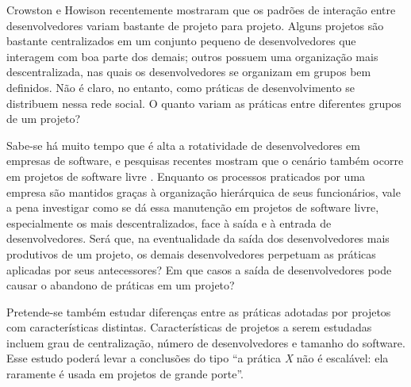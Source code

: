 \documentclass{article}
\begin{document}
Crowston e Howison \cite{crowston2005} recentemente mostraram que os padrões de
interação entre desenvolvedores variam bastante de projeto para projeto. Alguns
projetos são bastante centralizados em um conjunto pequeno de desenvolvedores
que interagem com boa parte dos demais; outros possuem uma organização mais
descentralizada, nas quais os desenvolvedores se organizam em grupos bem
definidos. Não é claro, no entanto, como práticas de desenvolvimento se
distribuem nessa rede social. O quanto variam as práticas entre diferentes
grupos de um projeto? 

Sabe-se há muito tempo que é alta a rotatividade de desenvolvedores em empresas
de software, e pesquisas recentes mostram que o cenário também ocorre em
projetos de software livre \cite{robles2006}. Enquanto os processos praticados
por uma empresa são mantidos graças à organização hierárquica de seus
funcionários, vale a pena investigar como se dá essa manutenção em projetos de
software livre, especialmente os mais descentralizados, face à saída e à entrada
de desenvolvedores. Será que, na eventualidade da saída dos desenvolvedores mais
produtivos de um projeto, os demais desenvolvedores perpetuam as práticas
aplicadas por seus antecessores? Em que casos a saída de desenvolvedores pode
causar o abandono de práticas em um projeto?

Pretende-se também estudar diferenças entre as práticas adotadas por projetos
com características distintas. Características de projetos a serem estudadas
incluem grau de centralização, número de desenvolvedores e tamanho do software.
Esse estudo poderá levar a conclusões do tipo ``a prática \emph{X} não é
escalável: ela raramente é usada em projetos de grande porte''. 
\end{document}
